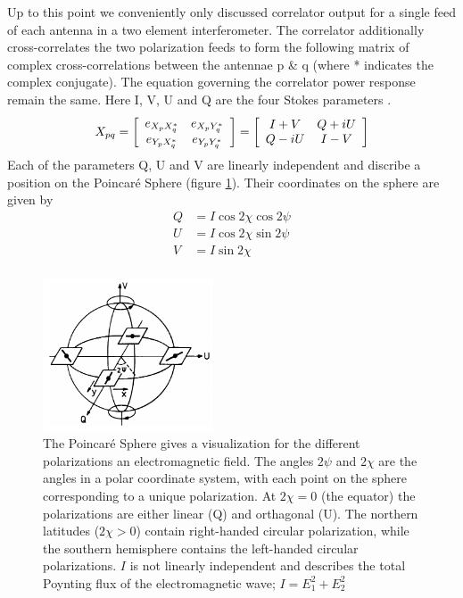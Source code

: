 \documentclass[a4paper,10pt]{report}
\begin{document}
Up to this point we conveniently only discussed correlator output for a single feed of each antenna in a two element interferometer. The correlator additionally cross-correlates the two polarization feeds to form the following matrix of complex cross-correlations between the
antennae p \& q (where * indicates the complex conjugate). The equation governing the correlator power response remain the same. Here I, V, U and Q are the four Stokes parameters \cite{taylor1999synthesis}.
\begin{equation}
X_{pq} = \left[\begin{array}{c c}
     e_{X_pX_q^*} & e_{X_pY_q^*} \\
     e_{Y_pX_q^*} & e_{Y_pY_q^*} \\
    \end{array}\right] = 
    \left[\begin{array}{c c}
     I + V & Q + iU \\
     Q - iU & I - V \\
    \end{array}\right]
\end{equation}
Each of the parameters Q, U and V are linearly independent and discribe a position on the Poincar\'e Sphere (figure \ref{fig_poincare}). Their coordinates on the sphere are given by
\begin{equation}
  \begin{split}
    Q &= I\cos{2\chi}\cos{2\psi}\\
    U &= I\cos{2\chi}\sin{2\psi}\\
    V &= I\sin{2\chi}\\
  \end{split}
\end{equation}

\begin{figure}
 \begin{mdframed}
 \centering
 \includegraphics[width=0.45\textwidth]{images/poincare_sphere.png}
 \caption[The Poincar\'e Sphere]{The Poincar\'e Sphere gives a visualization for the different polarizations an electromagnetic field. The angles $2\psi$ and
 $2\chi$ are the angles in a polar coordinate system, with each point on the sphere corresponding to a unique polarization. At $2\chi=0$ (the equator) the polarizations 
 are either linear (Q) and orthagonal (U). The northern latitudes ($2\chi > 0$) contain right-handed circular polarization, while the southern hemisphere 
 contains the left-handed circular polarizations. $I$ is not linearly independent and describes the total Poynting flux of the electromagnetic wave; $I = E_1^2 + E_2^2$ \cite{wilson2009tools}}
  \label{fig_poincare}
 \end{mdframed}
\end{figure}
\end{document}
